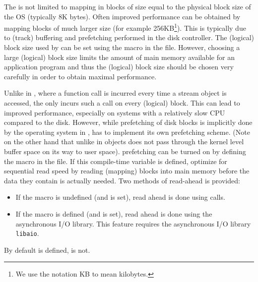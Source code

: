 The  is not limited to mapping in
blocks of size equal to the physical block size of the OS
(typically 8K bytes). Often improved performance can be
obtained by mapping blocks of much larger size (for example
256KB\footnote{We use the notation KB to mean kilobytes.}).
This is typically due to (track) buffering and prefetching
performed in the disk controller. The (logical) block size
used by  can be set using the macro
 in the
 file. However, choosing a large
(logical) block size limits the amount of main memory
available for an application program and thus the (logical)
block size should be chosen very carefully in order to
obtain maximal performance.

Unlike in , where a function call
is incurred every time a stream object is accessed, the
 only incurs such a call on every
(logical) block. This can lead to improved performance,
especially on systems with a relatively slow CPU compared to
the disk.  However, while prefetching of disk blocks is
implicitly done by the operating system in
,  has
to implement its own prefetching scheme. (Note on the other
hand that unlike in  objects does
not pass through the kernel level buffer space on its way to
user space).   prefetching can be
turned on by defining the macro
 in the 
file. If this compile-time variable is defined,
 optimize for sequential read speed
by reading (mapping) blocks into main memory before the data
they contain is actually needed. Two methods of read-ahead
is provided:

\begin{itemize}

    \item If the  macro is undefined
    (and  is set), read ahead
    is done using  calls.

    \item If the  macro is defined (and
     is set), read ahead is
    done using the asynchronous I/O library. This feature
    requires the asynchronous I/O library {\tt
       libaio}.

\end{itemize}
By default  is defined,
 is not.


